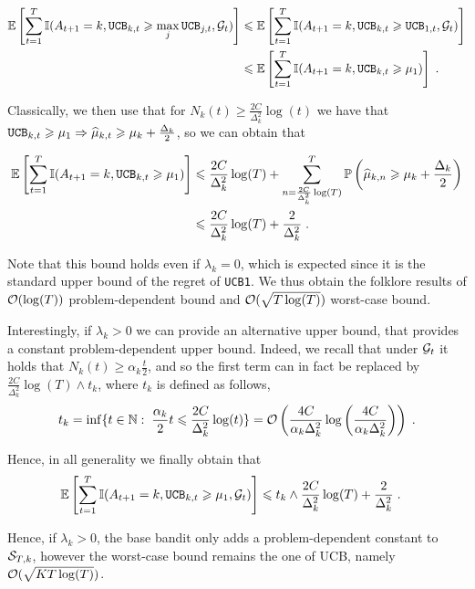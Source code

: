 \begin{align*}
\mathbb{E}\left[\sum_{t=1}^T \mathbb{I}(A_{t+1}=k, \texttt{UCB}_{k, t}\geqslant \max_j \texttt{UCB}_{j, t}, \mathcal{G}_t)\right] & \leqslant \mathbb{E}\left[\sum_{t=1}^T \mathbb{I}(A_{t+1}=k, \texttt{UCB}_{k, t}\geqslant \texttt{UCB}_{1, t}, \mathcal{G}_t)\right] \\
& \leqslant \mathbb{E}\left[\sum_{t=1}^T \mathbb{I}(A_{t+1}=k, \texttt{UCB}_{k, t}\geqslant \mu_1)\right] \;. \end{align*}

Classically, we then use that for $N_k(t)\geq \frac{2C}{\Delta_k^2} \log(t)$ we have that $\texttt{UCB}_{k, t}\geqslant \mu_1 \Rightarrow \widehat{\mu}_{k, t} \geqslant \mu_k + \frac{\Delta_k}{2}$, so we can obtain that 

\begin{align*}
\mathbb{E}\left[\sum_{t=1}^T \mathbb{I}(A_{t+1}=k, \texttt{UCB}_{k, t}\geqslant \mu_1)\right] &\leqslant \frac{2C}{\Delta_k^2} \log(T) + \sum_{n=\frac{2C}{\Delta_k^2} \log(T)}^T \mathbb{P}\left(\widehat{\mu}_{k, n}\geqslant \mu_k + \frac{\Delta_k}{2}\right) \\
& \leqslant \frac{2C}{\Delta_k^2} \log(T) + \frac{2}{\Delta_k^2} \;.
\end{align*}

Note that this bound holds even if $\lambda_k=0$, which is expected since it is the standard upper bound of the regret of \texttt{UCB1}. We thus obtain the folklore results of $\mathcal{O}(\log(T))$ problem-dependent bound and $\mathcal{O}(\sqrt{T\log(T)})$ worst-case bound.

Interestingly, if $\lambda_k>0$ we can provide an alternative upper bound, that provides a constant problem-dependent upper bound. Indeed, we recall that under $\mathcal{G}_t$ it holds that $N_k(t)\geq \alpha_k \frac{t}{2}$, and so the first term can in fact be replaced by $\frac{2C}{\Delta_k^2}\log(T)\wedge t_k$, where $t_k$ is defined as follows,
\[t_k = \inf\{t\in \mathbb{N}: \; \frac{\alpha_k}{2}t\leqslant \frac{2C}{\Delta_k^2} \log(t) \}= \mathcal{O}\left(\frac{4C}{\alpha_k \Delta_k^2}\log\left(\frac{4C}{\alpha_k\Delta_k^2}\right)\right)\;.\]

Hence, in all generality we finally obtain that 
\begin{align*}
\mathbb{E}\left[\sum_{t=1}^T \mathbb{I}(A_{t+1}=k, \texttt{UCB}_{k, t}\geqslant \mu_1, \mathcal{G}_t)\right] &\leqslant t_k \wedge  \frac{2C}{\Delta_k^2}\log(T) + \frac{2}{\Delta_k^2} \;.
\end{align*}

Hence, if $\lambda_k>0$, the base bandit only adds a problem-dependent constant to $\mathcal{S}_{T,k}$, however the worst-case bound remains the one of UCB, namely $\mathcal{O}(\sqrt{KT\log(T)})$.

